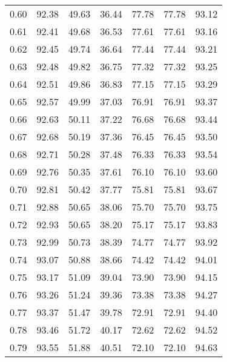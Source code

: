 \begin{tabular}{|c|c|c|c|c|c|c|}
      0.60 &     92.38 &     49.63 &      36.44 &   77.78 &      77.78 &         93.12 \\
      0.61 &     92.41 &     49.68 &      36.53 &   77.61 &      77.61 &         93.16 \\
      0.62 &     92.45 &     49.74 &      36.64 &   77.44 &      77.44 &         93.21 \\
      0.63 &     92.48 &     49.82 &      36.75 &   77.32 &      77.32 &         93.25 \\
      0.64 &     92.51 &     49.86 &      36.83 &   77.15 &      77.15 &         93.29 \\
      0.65 &     92.57 &     49.99 &      37.03 &   76.91 &      76.91 &         93.37 \\
      0.66 &     92.63 &     50.11 &      37.22 &   76.68 &      76.68 &         93.44 \\
      0.67 &     92.68 &     50.19 &      37.36 &   76.45 &      76.45 &         93.50 \\
      0.68 &     92.71 &     50.28 &      37.48 &   76.33 &      76.33 &         93.54 \\
      0.69 &     92.76 &     50.35 &      37.61 &   76.10 &      76.10 &         93.60 \\
      0.70 &     92.81 &     50.42 &      37.77 &   75.81 &      75.81 &         93.67 \\
      0.71 &     92.88 &     50.65 &      38.06 &   75.70 &      75.70 &         93.75 \\
      0.72 &     92.93 &     50.65 &      38.20 &   75.17 &      75.17 &         93.83 \\
      0.73 &     92.99 &     50.73 &      38.39 &   74.77 &      74.77 &         93.92 \\
      0.74 &     93.07 &     50.88 &      38.66 &   74.42 &      74.42 &         94.01 \\
      0.75 &     93.17 &     51.09 &      39.04 &   73.90 &      73.90 &         94.15 \\
      0.76 &     93.26 &     51.24 &      39.36 &   73.38 &      73.38 &         94.27 \\
      0.77 &     93.37 &     51.47 &      39.78 &   72.91 &      72.91 &         94.40 \\
      0.78 &     93.46 &     51.72 &      40.17 &   72.62 &      72.62 &         94.52 \\
      0.79 &     93.55 &     51.88 &      40.51 &   72.10 &      72.10 &         94.63 \\

\end{tabular}

